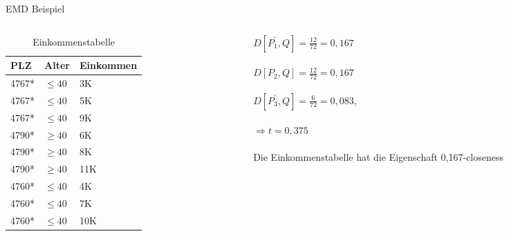 \begin{frame} {EMD Beispiel}
	
	\begin{columns}[T]
		\begin{column}{0.5\textwidth}
			\begin{table}[]
				\centering
				\label{tclossenessExample}
				\begin{tabular}{|l|l|l|}
					\hline
					\textbf{PLZ}   & \textbf{Alter}    & \textbf{Einkommen} \\\hline
					4767* & $\le 40$ & 3K \\
					4767* & $\le 40$ & 5K \\
					4767* & $\le 40$ & 9K \\\hline
					4790* & $\ge 40$ & 6K \\
					4790* & $\ge 40$ & 8K \\
					4790* & $\ge 40$ & 11K \\\hline
					4760* & $\le 40$ & 4K \\
					4760* & $\le 40$ & 7K \\
					4760* & $\le 40$ & 10K \\\hline
				\end{tabular}
				\caption{Einkommenstabelle}
			\end{table}
		\end{column}
		
		\begin{column}{0.5\textwidth}
			$D[P_1^{'},Q]=\frac{12}{72} = 0,167$\\
			\ \\
			$D[P_2,Q]=\frac{12}{72} = 0,167$\\
			\ \\
			$D[P_3^{'},Q]=\frac{6}{72} = 0,083,$\\
			\ \\
			$\Rightarrow t=0,375$\\
			\ \\
			Die Einkommenstabelle hat die Eigenschaft 0,167-closeness	
		\end{column}
	\end{columns}

\end{frame}
